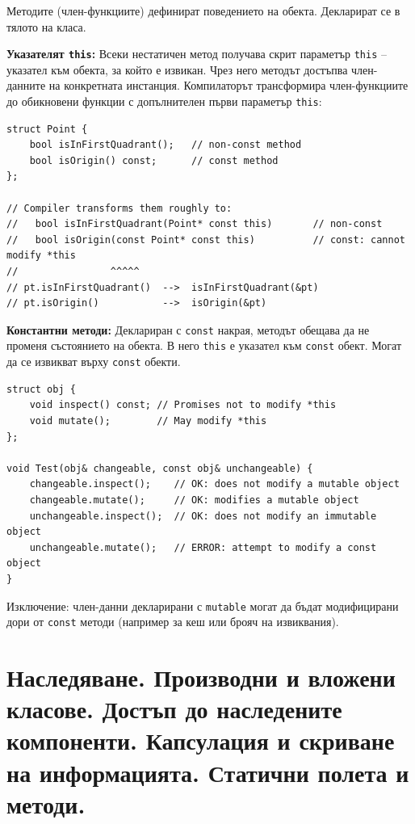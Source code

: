 \documentclass{scrartcl}
\begin{document}
\begin{FlushLeft}
Методите (член-функциите) дефинират поведението на обекта. Декларират се в тялото на класа.

\textbf{Указателят \texttt{this}:} Всеки нестатичен метод получава скрит параметър \texttt{this} -- указател към обекта, за който е извикан. Чрез него методът достъпва член-данните на конкретната инстанция. Компилаторът трансформира член-функциите до обикновени функции с допълнителен първи параметър \texttt{this}:

\begin{lstlisting}
struct Point {
    bool isInFirstQuadrant();   // non-const method
    bool isOrigin() const;      // const method
};

// Compiler transforms them roughly to:
//   bool isInFirstQuadrant(Point* const this)       // non-const
//   bool isOrigin(const Point* const this)          // const: cannot modify *this
//                ^^^^^
// pt.isInFirstQuadrant()  -->  isInFirstQuadrant(&pt)
// pt.isOrigin()           -->  isOrigin(&pt)
\end{lstlisting}

\textbf{Константни методи:} Деклариран с \texttt{const} накрая, методът обещава да не променя състоянието на обекта. В него \texttt{this} е указател към \texttt{const} обект. Могат да се извикват върху \texttt{const} обекти.

\begin{lstlisting}
struct obj {
    void inspect() const; // Promises not to modify *this
    void mutate();        // May modify *this
};

void Test(obj& changeable, const obj& unchangeable) {
    changeable.inspect();    // OK: does not modify a mutable object
    changeable.mutate();     // OK: modifies a mutable object
    unchangeable.inspect();  // OK: does not modify an immutable object
    unchangeable.mutate();   // ERROR: attempt to modify a const object
}
\end{lstlisting}

Изключение: член-данни декларирани с \texttt{mutable} могат да бъдат модифицирани дори от \texttt{const} методи (например за кеш или брояч на извиквания).

\section{Наследяване. Производни и вложени класове. Достъп до наследените
компоненти. Капсулация и скриване на информацията. Статични полета и методи.}


\end{FlushLeft}
\end{document}
